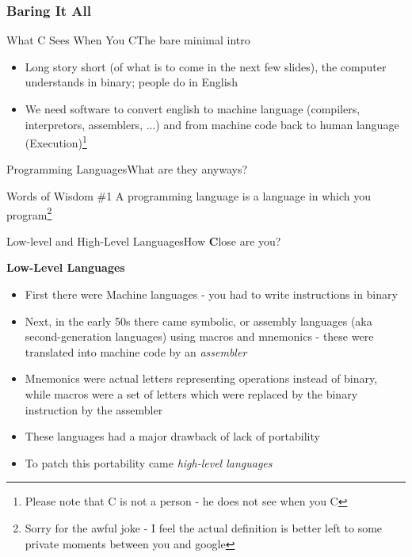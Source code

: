 \documentclass{beamer}
\begin{document}
\subsubsection{Baring It All}
\begin{frame}{What C Sees When You C}{The bare minimal intro}
\begin{itemize}
\item Long story short (of what is to come in the next few slides), the computer understands in binary; people do in English
\item We need software to convert english to machine language (compilers, interpretors, assemblers, ...) and from machine code back to human language (Execution)\footnote{Please note that C is not a person - he does not see when you C}
\end{itemize}
\end{frame}
\begin{frame}{Programming Languages}{What are they anyways?}
\begin{block}{Words of Wisdom \#1}
A programming language is a language in which you program\footnote{Sorry for the awful joke - I feel the actual definition is better left to some private moments between you and google}
\end{block}
\end{frame}
\begin{frame}{Low-level and High-Level Languages}{How \textbf{C}lose are you?}
\begin{center}
\textbf{Low-Level Languages}
\end{center}
\begin{itemize}
\item<1-> First there were Machine languages - you had to write instructions in binary
\item<2-> Next, in the early 50s there came symbolic, or assembly languages (aka second-generation languages) using macros and mnemonics - these were translated into machine code by an \emph{assembler}
\item<2-> Mnemonics were actual letters representing operations instead of binary, while macros were a set of letters which were replaced by the binary instruction by the assembler
\item<3-> These languages had a major drawback of lack of portability
\item<4-> To patch this portability came \emph{high-level languages}
\end{itemize}
\end{frame}
\end{document}
